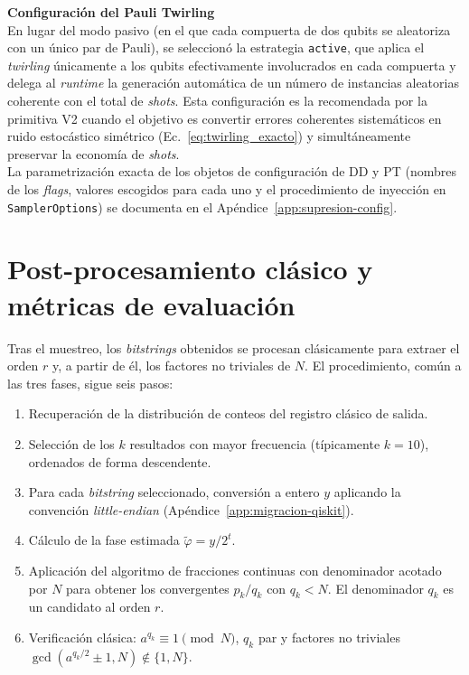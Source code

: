 \documentclass[12pt, spanish]{book}
\begin{document}
\textbf{Configuración del Pauli Twirling}\\

En lugar del modo pasivo (en el que cada compuerta de dos qubits se aleatoriza con un único par de Pauli), se seleccionó la estrategia \texttt{active}, que aplica el \textit{twirling} únicamente a los qubits efectivamente involucrados en cada compuerta y delega al \textit{runtime} la generación automática de un número de instancias aleatorias coherente con el total de \textit{shots}. Esta configuración es la recomendada por la primitiva V2 cuando el objetivo es convertir errores coherentes sistemáticos en ruido estocástico simétrico (Ec.~\ref{eq:twirling_exacto}) y simultáneamente preservar la economía de \textit{shots}.\\

La parametrización exacta de los objetos de configuración de DD y PT (nombres de los \textit{flags}, valores escogidos para cada uno y el procedimiento de inyección en \texttt{SamplerOptions}) se documenta en el Apéndice~\ref{app:supresion-config}.

\section{Post-procesamiento clásico y métricas de evaluación}
\label{sec:postprocesamiento}

Tras el muestreo, los \textit{bitstrings} obtenidos se procesan clásicamente para extraer el orden $r$ y, a partir de él, los factores no triviales de $N$. El procedimiento, común a las tres fases, sigue seis pasos:

\begin{enumerate}
    \item Recuperación de la distribución de conteos del registro clásico de salida.
    \item Selección de los $k$ resultados con mayor frecuencia (típicamente $k = 10$), ordenados de forma descendente.
    \item Para cada \textit{bitstring} seleccionado, conversión a entero $y$ aplicando la convención \textit{little-endian} (Apéndice~\ref{app:migracion-qiskit}).
    \item Cálculo de la fase estimada $\tilde{\varphi} = y / 2^t$.
    \item Aplicación del algoritmo de fracciones continuas con denominador acotado por $N$ para obtener los convergentes $p_k / q_k$ con $q_k < N$. El denominador $q_k$ es un candidato al orden $r$.
    \item Verificación clásica: $a^{q_k} \equiv 1 \pmod{N}$, $q_k$ par y factores no triviales $\gcd(a^{q_k/2} \pm 1, N) \notin \{1, N\}$.
\end{enumerate}
\end{document}
